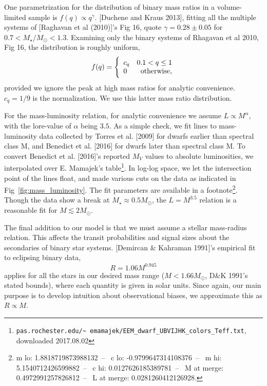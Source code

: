 \documentclass{emulateapj}
\begin{document}
One parametrization for the distribution of 
binary mass ratios in a volume-limited sample is $f(q)\propto q^\gamma$.
[Duchene and Kraus 2013], fitting all the multiple systems of [Raghavan et al 
(2010)]'s Fig 16, quote $\gamma = 0.28\pm0.05$ for $0.7<M_\star/M_\odot<1.3$.
Examining only the binary systems of Rhagavan et al 2010, Fig 16, the 
distribution is roughly uniform,
\begin{equation}
f(q) =
\Bigg\{\begin{array}{lr}
c_q & 0.1 < q \leq 1  \\
0 & {\rm otherwise},
\end{array}
\label{eq:mass_ratio}
\end{equation}
provided we ignore the peak at high mass ratios for analytic convenience. $c_q 
= 1/9$ is the normalization.
We use this latter mass ratio distribution.

For the mass-luminosity relation, for analytic convenience we assume 
$L \propto M^\alpha$, with the lore-value of $\alpha$ being $3.5$.
As a simple check, we fit lines to mass-luminosity data collected by 
Torres et al. [2009] for dwarfs earlier than spectral class M, and Benedict 
et al. [2016] for dwarfs later than spectral class M.
To convert Benedict et al. [2016]'s reported $M_V$ values to absolute 
luminosities, we interpolated over E. Mamajek's 
table\footnote{
	\texttt{pas.rochester.edu/\textasciitilde 
		emamajek/EEM\_dwarf\_UBVIJHK\_colors\_Teff.txt},
	downloaded 2017.08.02}.
In log-log space, we let the intersection point of the lines float, and made 
various cuts on the data as indicated in Fig~\ref{fig:mass_luminosity}. The 
fit parameters are available in a footnote\footnote{
	m lo: 1.8818719873988132~--~
	c lo: -0.9799647314108376~--~
	m hi: 5.1540712426599882~--~
	c hi: 0.0127626185389781~--~
	M at merge: 0.4972991257826812~--~
	L at merge: 0.0281260412126928.
}. Though the data show a break at $M_\star \approx 0.5M_\odot$, the 
$L=M^{3.5}$ relation is a reasonable fit for $M\lesssim 2M_\odot$.

The final addition to our model is that we must assume a stellar mass-radius 
relation.
This affects the transit probabilities and signal sizes about the 
secondaries of binary star systems.
[Demircan \& Kahraman 1991]'s empirical fit to eclipsing 
binary data,
\begin{equation}
R = 1.06 M^{0.945}
\label{eq:mass_radius}
\end{equation}
applies for all the stars in our desired mass range ($M < 1.66M_\odot$, D\&K 
1991's stated bounds), where each quantity is given in solar units. 
Since again, our main purpose is to develop intuition about observational 
biases, we approximate this as $R\propto M$.
\end{document}
